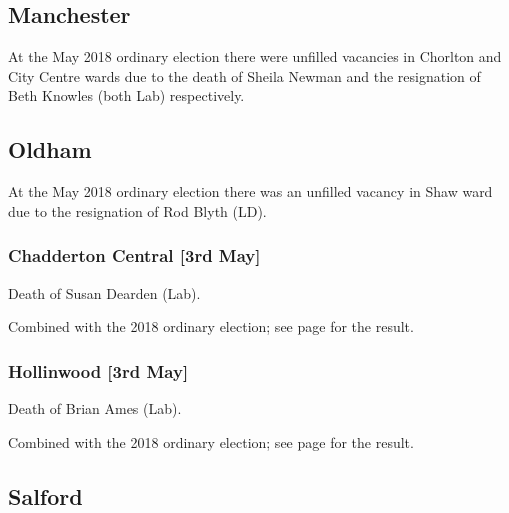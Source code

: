 \documentclass[a4paper,openany]{book}
\begin{document}
\begin{resultsiii}
\subsection*{Manchester}

At the May 2018 ordinary election there were unfilled vacancies in Chorlton and City Centre wards due to the death of Sheila Newman and the resignation of Beth Knowles (both Lab) respectively.

\subsection*{Oldham}

At the May 2018 ordinary election there was an unfilled vacancy in Shaw ward due to the resignation of Rod Blyth (LD).

\subsubsection*{Chadderton Central \hspace*{\fill}\nolinebreak[1]%
\enspace\hspace*{\fill}
[3rd May]}


Death of Susan Dearden (Lab).

Combined with the 2018 ordinary election; see page \pageref{ChaddertonCentralOldham} for the result.

\subsubsection*{Hollinwood \hspace*{\fill}\nolinebreak[1]%
\enspace\hspace*{\fill}
[3rd May]}


Death of Brian Ames (Lab).

Combined with the 2018 ordinary election; see page \pageref{HollinwoodOldham} for the result.

\subsection*{Salford}


\end{resultsiii}
\end{document}
